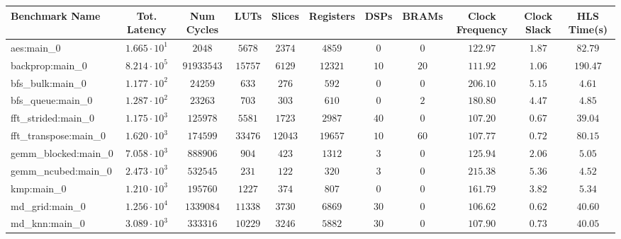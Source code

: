 \begin{tabular}{|l|c|c|c|c|c|c|c|c|c|c|}
\hline
Benchmark Name         & Tot. Latency           & Num Cycles   & LUTs       & Slices    & Registers & DSPs    & BRAMs  & Clock Frequency & Clock Slack & HLS Time(s) \\
\hline
aes:main\_0            & $ 1.665 \cdot 10^{1} $ & $ 2048     $ & $ 5678   $ & $ 2374  $ & $ 4859  $ & $ 0   $ & $ 0  $ & $ 122.97      $ & $ 1.87    $ & $ 82.79   $ \\
backprop:main\_0       & $ 8.214 \cdot 10^{5} $ & $ 91933543 $ & $ 15757  $ & $ 6129  $ & $ 12321 $ & $ 10  $ & $ 20 $ & $ 111.92      $ & $ 1.06    $ & $ 190.47  $ \\
bfs\_bulk:main\_0      & $ 1.177 \cdot 10^{2} $ & $ 24259    $ & $ 633    $ & $ 276   $ & $ 592   $ & $ 0   $ & $ 0  $ & $ 206.10      $ & $ 5.15    $ & $ 4.61    $ \\
bfs\_queue:main\_0     & $ 1.287 \cdot 10^{2} $ & $ 23263    $ & $ 703    $ & $ 303   $ & $ 610   $ & $ 0   $ & $ 2  $ & $ 180.80      $ & $ 4.47    $ & $ 4.85    $ \\
fft\_strided:main\_0   & $ 1.175 \cdot 10^{3} $ & $ 125978   $ & $ 5581   $ & $ 1723  $ & $ 2987  $ & $ 40  $ & $ 0  $ & $ 107.20      $ & $ 0.67    $ & $ 39.04   $ \\
fft\_transpose:main\_0 & $ 1.620 \cdot 10^{3} $ & $ 174599   $ & $ 33476  $ & $ 12043 $ & $ 19657 $ & $ 10  $ & $ 60 $ & $ 107.77      $ & $ 0.72    $ & $ 80.15   $ \\
gemm\_blocked:main\_0  & $ 7.058 \cdot 10^{3} $ & $ 888906   $ & $ 904    $ & $ 423   $ & $ 1312  $ & $ 3   $ & $ 0  $ & $ 125.94      $ & $ 2.06    $ & $ 5.05    $ \\
gemm\_ncubed:main\_0   & $ 2.473 \cdot 10^{3} $ & $ 532545   $ & $ 231    $ & $ 122   $ & $ 320   $ & $ 3   $ & $ 0  $ & $ 215.38      $ & $ 5.36    $ & $ 4.52    $ \\
kmp:main\_0            & $ 1.210 \cdot 10^{3} $ & $ 195760   $ & $ 1227   $ & $ 374   $ & $ 807   $ & $ 0   $ & $ 0  $ & $ 161.79      $ & $ 3.82    $ & $ 5.34    $ \\
md\_grid:main\_0       & $ 1.256 \cdot 10^{4} $ & $ 1339084  $ & $ 11338  $ & $ 3730  $ & $ 6869  $ & $ 30  $ & $ 0  $ & $ 106.62      $ & $ 0.62    $ & $ 40.60   $ \\
md\_knn:main\_0        & $ 3.089 \cdot 10^{3} $ & $ 333316   $ & $ 10229  $ & $ 3246  $ & $ 5882  $ & $ 30  $ & $ 0  $ & $ 107.90      $ & $ 0.73    $ & $ 40.05   $ \\

\end{tabular}
